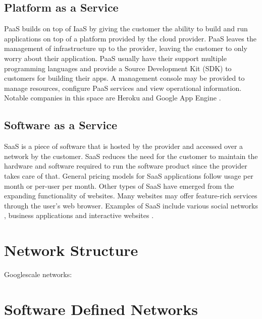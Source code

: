 \documentclass[fullapage,12pt]{article}
\begin{document}
\subsection{Platform as a Service} \label{ssub:paas}

PaaS builds on top of IaaS by giving the customer the ability to build and run applications on top of a platform provided by the cloud provider. PaaS leaves the management of infrastructure up to the provider, leaving the customer to only worry about their application. PaaS usually have their support multiple programming languages and provide a Source Development Kit (SDK) to customers for building their apps. A management console may be provided to manage resources, configure PaaS services and view operational information. Notable companies in this space are Heroku \cite{heroku} and Google App Engine \cite{googleappengine}.

\subsection{Software as a Service} \label{sub:saas}

SaaS is a piece of software that is hosted by the provider and accessed over a network by the customer. SaaS reduces the need for the customer to maintain the hardware and software required to run the software product since the provider takes care of that. General pricing models for SaaS applications follow usage per month or per-user per month. Other types of SaaS have emerged from the expanding functionality of websites. Many websites may offer feature-rich services through the user's web browser. Examples of SaaS include various social networks \cite{facebook}, business applications \cite{salesforce} and interactive websites \cite{netflix}.




\section{Network Structure} \label{sec:network-structure}

Googlescale networks: \cite{singh2015jupiter} %

\section{Software Defined Networks} \label{sec:sdn}
\end{document}
